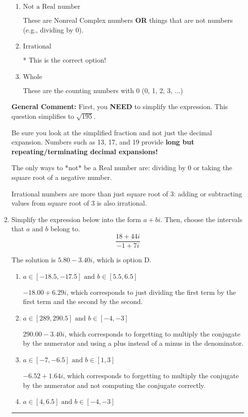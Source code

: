 \documentclass{extbook}[14pt]
\newcommand{\litem}[1]{\item #1

\rule{\textwidth}{0.4pt}}
\begin{document}
\begin{enumerate}
{\begin{enumerate}[label=\Alph*.]
These are numbers that can be written as fraction of Integers (e.g., -2/3)
\item \( \text{Not a Real number} \)

These are Nonreal Complex numbers \textbf{OR} things that are not numbers (e.g., dividing by 0).
\item \( \text{Irrational} \)

* This is the correct option!
\item \( \text{Whole} \)

These are the counting numbers with 0 (0, 1, 2, 3, ...)
\end{enumerate}

\textbf{General Comment:} First, you \textbf{NEED} to simplify the expression. This question simplifies to $\sqrt{195}$. 
 
 Be sure you look at the simplified fraction and not just the decimal expansion. Numbers such as 13, 17, and 19 provide \textbf{long but repeating/terminating decimal expansions!} 
 
 The only ways to *not* be a Real number are: dividing by 0 or taking the square root of a negative number. 
 
 Irrational numbers are more than just square root of 3: adding or subtracting values from square root of 3 is also irrational.
}
\litem{
Simplify the expression below into the form $a+bi$. Then, choose the intervals that $a$ and $b$ belong to.
\[ \frac{18 + 44 i}{-1 + 7 i} \]

The solution is \( 5.80  - 3.40 i \), which is option D.\begin{enumerate}[label=\Alph*.]
\item \( a \in [-18.5, -17.5] \text{ and } b \in [5.5, 6.5] \)

 $-18.00  + 6.29 i$, which corresponds to just dividing the first term by the first term and the second by the second.
\item \( a \in [289, 290.5] \text{ and } b \in [-4, -3] \)

 $290.00  - 3.40 i$, which corresponds to forgetting to multiply the conjugate by the numerator and using a plus instead of a minus in the denominator.
\item \( a \in [-7, -6.5] \text{ and } b \in [1, 3] \)

 $-6.52  + 1.64 i$, which corresponds to forgetting to multiply the conjugate by the numerator and not computing the conjugate correctly.
\item \( a \in [4, 6.5] \text{ and } b \in [-4, -3] \)


\end{enumerate}}
\end{enumerate}
\end{document}
